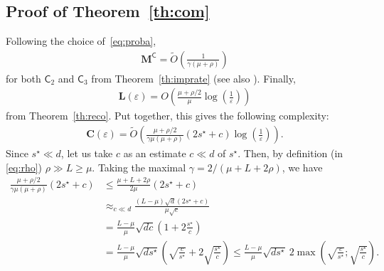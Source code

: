 \subsection{Proof of Theorem~\ref{th:com}}\label{apx:com}

Following the choice of~\eqref{eq:proba},
\begin{align*}
    \mathbf{M}^{\mathsf{C}} = \tilde{O}\left( \frac{1}{\gamma(\mu+\rho)} \right)
\end{align*}
for both $\mathsf{C}_2$ and $\mathsf{C}_3$ from Theorem~\ref{th:imprate} (see also \cite[Lemma~11]{lin2017catalyst}). Finally, 
\begin{align*}
    \mathbf{L}(\varepsilon) = {O}\left( \frac{\mu + \rho/2}{\mu} \log\left( \frac{1}{\varepsilon} \right) \right) 
\end{align*}
from Theorem~\ref{th:reco}.
Put together, this gives the following complexity:
\begin{align*}
     \mathbf{C}(\varepsilon) = \tilde{O}\left( \frac{\mu + \rho/2}{\gamma \mu (\mu+\rho)} (2s^\star + c) \log\left( \frac{1}{\varepsilon} \right) \right).
\end{align*}
    Since $s^\star \ll d$, let us take $c$ as an estimate $c \ll d$ of $s^\star$. Then, by definition (in \eqref{eq:rho}) $\rho\gg L\geq\mu $. Taking  the maximal $\gamma = 2/(\mu+L+2\rho)$, we have 
    \begin{align*}
        \frac{\mu + \rho/2}{\gamma \mu (\mu+\rho)} (2s^\star + c) &\leq \frac{\mu + L + 2\rho}{2  \mu} (2s^\star + c)\\
        &\approx_{c\ll d} \frac{(L-\mu)\sqrt{d}(2s^\star + c) }{  \mu \sqrt{ c}} \\
        &= \frac{L-\mu}{\mu} \sqrt{d c } \left(1+2\frac{s^\star}{c} \right)\\
        &= \frac{L-\mu}{\mu} \sqrt{d s^\star } \left(\sqrt{\frac{c}{s^\star}}+2\sqrt{\frac{s^\star}{c}} \right) \leq \frac{L-\mu}{\mu} \sqrt{d s^\star } ~ 2 \max \left(\sqrt{\frac{c}{s^\star}};\sqrt{\frac{s^\star}{c}} \right).
    \end{align*}

